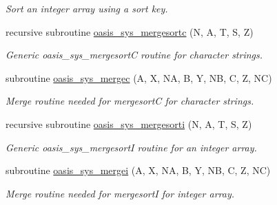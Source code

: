 \begin{DoxyCompactItemize}
\begin{DoxyCompactList}\small\item\em Sort an integer array using a sort key. \end{DoxyCompactList}\item 
recursive subroutine \hyperlink{namespacemod__oasis__sys_a30b91b7cab02c85d85fb7a7debdd5ec2}{oasis\+\_\+sys\+\_\+mergesortc} (N, A, T, S, Z)
\begin{DoxyCompactList}\small\item\em Generic oasis\+\_\+sys\+\_\+mergesortC routine for character strings. \end{DoxyCompactList}\item 
subroutine \hyperlink{namespacemod__oasis__sys_a27e13d259fbecbfe09e750d16f50ef25}{oasis\+\_\+sys\+\_\+mergec} (A, X, NA, B, Y, NB, C, Z, NC)
\begin{DoxyCompactList}\small\item\em Merge routine needed for mergesortC for character strings. \end{DoxyCompactList}\item 
recursive subroutine \hyperlink{namespacemod__oasis__sys_a298b27e03ff339d56eda3c5b31115781}{oasis\+\_\+sys\+\_\+mergesorti} (N, A, T, S, Z)
\begin{DoxyCompactList}\small\item\em Generic oasis\+\_\+sys\+\_\+mergesortI routine for an integer array. \end{DoxyCompactList}\item 
subroutine \hyperlink{namespacemod__oasis__sys_a5384f02abfdf4a5cee0706ddefecde87}{oasis\+\_\+sys\+\_\+mergei} (A, X, NA, B, Y, NB, C, Z, NC)
\begin{DoxyCompactList}\small\item\em Merge routine needed for mergesortI for integer array. \end{DoxyCompactList}\end{DoxyCompactItemize}
